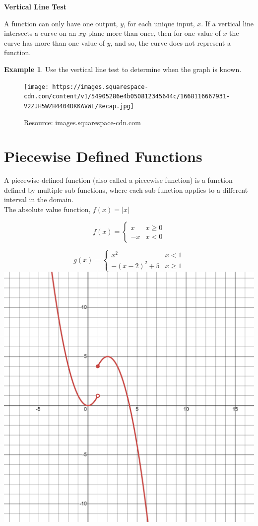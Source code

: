 \documentclass[
]{book}
\theoremstyle{definition}
\theoremstyle{definition}
\newtheorem{example}{Example}[chapter]
\theoremstyle{definition}
\theoremstyle{definition}
\theoremstyle{remark}
\begin{document}
\textbf{Vertical Line Test}

A function can only have one output, \(y\), for each unique input, \(x\). If a vertical line intersects a curve on an \(xy\)-plane more than once, then for one value of \(x\) the curve has more than one value of \(y\), and so, the curve does not represent a function.

\begin{example}
\protect\hypertarget{exm:unnamed-chunk-4}{}\label{exm:unnamed-chunk-4}Use the vertical line test to determine when the graph is known.
\end{example}

\begin{figure}
\centering
\texttt{[image: https://images.squarespace-cdn.com/content/v1/54905286e4b050812345644c/1668116667931-V2ZJH5WZH4404DKKAVWL/Recap.jpg]}
\caption{Resource: images.squarespace-cdn.com}
\end{figure}

\section{Piecewise Defined Functions}\label{piecewise-defined-functions}

A piecewise-defined function (also called a piecewise function) is a function defined by multiple sub-functions, where each sub-function applies to a different interval in the domain.\\
The absolute value function, \(f(x) = |x|\)

\[f(x) = \begin{cases} x & x \ge 0 \\ -x & x < 0 \end{cases}\]


\[g(x) = \begin{cases} x^2 & x < 1 \\ -(x - 2)^2 + 5 & x \geq 1 \end{cases}\]
\includegraphics{fig/fig6.png}
\end{document}
